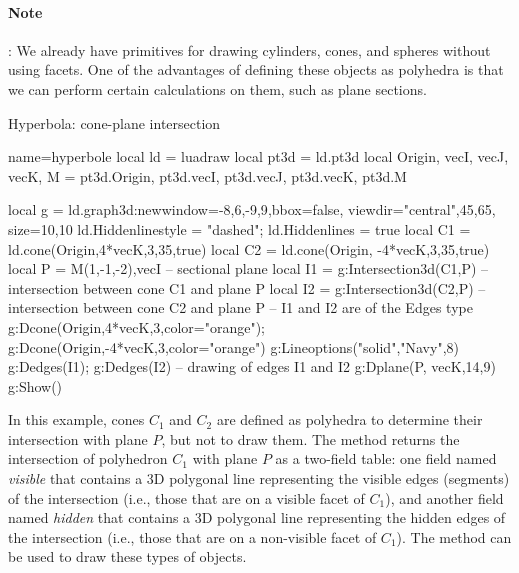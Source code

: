 \paragraph{Note}: We already have primitives for drawing cylinders, cones, and spheres without using facets. One of the advantages of defining these objects as polyhedra is that we can perform certain calculations on them, such as plane sections.

\begin{demo}{Hyperbola: cone-plane intersection}
\begin{luadraw}{name=hyperbole}
local ld = luadraw
local pt3d = ld.pt3d
local Origin, vecI, vecJ, vecK, M = pt3d.Origin, pt3d.vecI, pt3d.vecJ, pt3d.vecK, pt3d.M

local g = ld.graph3d:new{window={-8,6,-9,9},bbox=false, 
    viewdir={"central",45,65}, size={10,10}}
ld.Hiddenlinestyle = "dashed"; ld.Hiddenlines = true
local C1 = ld.cone(Origin,4*vecK,3,35,true)
local C2 = ld.cone(Origin, -4*vecK,3,35,true)
local P = {M(1,-1,-2),vecI} -- sectional plane
local I1 = g:Intersection3d(C1,P) -- intersection between cone C1 and plane P
local I2 = g:Intersection3d(C2,P) -- intersection between cone C2 and plane P
-- I1 and I2 are of the Edges type
g:Dcone(Origin,4*vecK,3,{color="orange"}); g:Dcone(Origin,-4*vecK,3,{color="orange"})
g:Lineoptions("solid","Navy",8)
g:Dedges(I1); g:Dedges(I2) -- drawing of edges I1 and I2
g:Dplane(P, vecK,14,9)
g:Show()
\end{luadraw}
\end{demo}

In this example, cones $C_1$ and $C_2$ are defined as polyhedra to determine their intersection with plane $P$, but not to draw them. The method  returns the intersection of polyhedron $C_1$ with plane $P$ as a two-field table: one field named \emph{visible} that contains a 3D polygonal line representing the visible edges (segments) of the intersection (i.e., those that are on a visible facet of $C_1$), and another field named \emph{hidden} that contains a 3D polygonal line representing the hidden edges of the intersection (i.e., those that are on a non-visible facet of $C_1$). The method  can be used to draw these types of objects.

